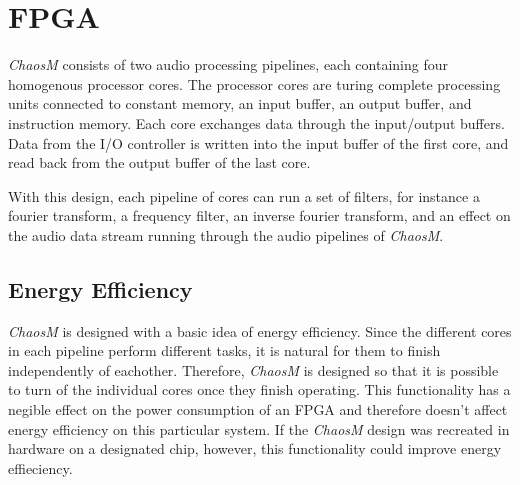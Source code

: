 \FloatBarrier
\section{FPGA}\label{chapter:fpga}

\textit{ChaosM} consists of two audio processing pipelines, each containing four
homogenous processor cores. The processor cores are turing complete processing
units connected to constant memory, an input buffer, an output buffer, and
instruction memory. Each core exchanges data through the input/output buffers.
Data from the I/O controller is written into the input buffer of the first core, and read
back from the output buffer of the last core.

With this design, each pipeline of cores can run a set of filters, for instance
a fourier transform, a frequency filter, an inverse fourier transform, and an
effect on the audio data stream running through the audio pipelines of \textit{ChaosM}.







\subsection{Energy Efficiency}
\textit{ChaosM} is designed with a basic idea of energy efficiency. Since the different cores
in each pipeline perform different tasks, it is natural for them to finish independently of 
eachother. Therefore, \textit{ChaosM} is designed so that it is possible to turn of the individual 
cores once they finish operating. This functionality has a negible effect on the power consumption
of an FPGA and therefore doesn't affect energy efficiency on this particular system. If the
\textit{ChaosM} design was recreated in hardware on a designated chip, however, this functionality
could improve energy effieciency.
